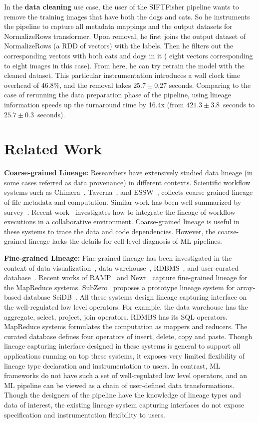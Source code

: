 \documentclass{sig-alternate}
\begin{document}
In the {\bf data cleaning} use case, the user of the SIFTFisher pipeline wants to remove the training images that have both the dogs and cats.
So he instruments the pipeline to capture all metadata mappings and the output datasets for NormalizeRows transformer. 
Upon removal, he first joins the output dataset of NormalizeRows (a RDD of vectors) with the labels.
Then he filters out the corresponding vectors with both cats and dogs in it ( eight vectors corresponding to eight images in this case). 
From here, he can try retrain the model with the cleaned dataset. 
This particular instrumentation introduces a wall clock time overhead of 46.8\%, and the removal takes $25.7\pm0.27$ seconds.
Comparing to the case of rerunning the data preparation phase of the pipeline, using lineage information speeds up the turnaround
time by 16.4x (from $421.3\pm3.8$~seconds to $25.7\pm0.3$~seconds). 


\section{Related Work}
\label{sec:Related}
{\bf Coarse-grained Lineage:} Researchers have extensively studied data lineage (in some cases referred as data provenance) in different contexts.
Scientific workflow systems such as  Chimera~\cite{foster02}, Taverna~\cite{oinn02}, and ESSW~\cite{frew01}, 
collects coarse-grained lineage of file metadata and computation. 
Similar work has been well summarized by survey~\cite{simmhan05, freire08, bose05}.
Recent work~\cite{altintas10} investigates how to integrate the lineage of workflow executions
in a collaborative environment. Coarse-grained lineage is useful in these systems to trace the data and code dependencies.
However, the coarse-grained lineage lacks the details for cell level diagnosis of ML pipelines.

{\bf Fine-grained Lineage:} Fine-grained lineage has been investigated in the context of data visualization~\cite{stonebraker93, woodruff97},  
data warehouse~\cite{cui00, cui03}, RDBMS~\cite{widom04}, and user-curated database~\cite{buneman06}.
Recent works of RAMP~\cite{ikeda11, park11} and Newt~\cite{logothetis13} capture fine-grained lineage for the MapReduce
systems. SubZero~\cite{wu13} proposes a prototype lineage system for array-based database SciDB~\cite{brown10}.
All these systems design lineage capturing interface on the well-regulated low level operators.
For example, the data warehouse has the aggregate, select, project, join operators. 
RDMBS has its SQL operators. MapReduce systems formulates the computation as mappers and reducers.
The curated database defines four operators of insert, delete, copy and paste.
Though lineage capturing interface designed in these systems is general to support all applications running on top these systems,
it exposes very limited flexibility of lineage type declaration and instrumentation to users.
In contrast, ML frameworks do not have such a set of well-regulated low level operators, 
and an ML pipeline can be viewed as a chain of user-defined data transformations.
Though the designers of the pipeline have the knowledge of lineage types and data of interest,
the existing lineage system capturing interfaces do not expose specification and instrumentation flexibility to users. 
\end{document}
